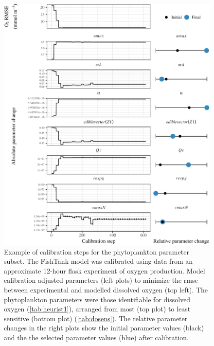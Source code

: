 \documentclass[review]{elsarticle}\usepackage[]{graphicx}\usepackage[]{color}
\begin{document}
\begin{figure}[!ht]

{\centering \includegraphics[width=\textwidth]{figs/calex-1} 

}

\caption{Example of calibration steps for the phytoplankton parameter subset.  The FishTank model was calibrated using data from an approximate 12-hour flask experiment of oxygen production.  Model calibration adjusted parameters (left plots) to minimize the \ac{rmse} between experimental and modelled dissolved oxygen (top left).  The phytoplankton parameters were those identifiable for dissolved oxygen (\cref{tab:heurist1}), arranged from most (top plot) to least sensitive (bottom plot) (\cref{tab:dosens}).  The relative parameter changes in the right plots show the initial parameter values (black) and the the selected parameter values (blue) after calibration.}\label{fig:calex}
\end{figure}
\end{document}
